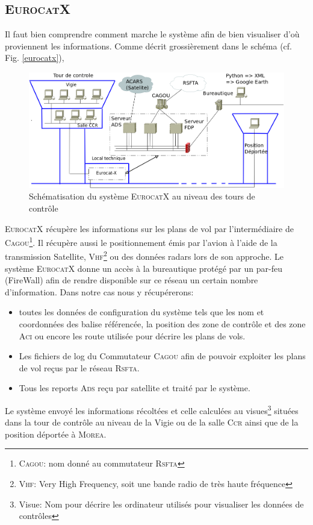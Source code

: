     \subsection{\textsc{EurocatX}}
Il faut bien comprendre comment marche le système afin de bien visualiser d'où proviennent les informations. Comme décrit grossièrement dans le schéma (cf. Fig. \vref{eurocatx}),
\begin{figure}
    \center
    \includegraphics[width=15cm]{images/SchemaControle.png}
    \caption{Schématisation du système \textsc{EurocatX} au niveau des tours de contrôle}
    \label{eurocatx}
\end{figure}
\textsc{EurocatX} récupère les informations sur les plans de vol par l'intermédiaire de \textsc{Cagou}\footnote{\textsc{Cagou}: nom donné au commutateur \textsc{Rsfta}}. Il récupère aussi le positionnement émis par l'avion à l'aide de la transmission Satellite, \textsc{Vhf}\footnote{\textsc{Vhf}: Very High Frequency, soit une bande radio de très haute fréquence} ou des données radars lors de son approche. Le système \textsc{EurocatX} donne un accès à la bureautique protégé par un par-feu (FireWall) afin de rendre disponible sur ce réseau un certain nombre d'information. Dans notre cas nous y récupérerons:
\begin{itemize}
    \item toutes les données de configuration du système tels que les nom et coordonnées des balise référencée, la position des zone de contrôle et des zone \textsc{Aci} ou encore les route utilisée pour décrire les plans de vols.
    \item Les fichiers de log du Commutateur \textsc{Cagou} afin de pouvoir exploiter les plans de vol reçus par le réseau \textsc{Rsfta}.
    \item Tous les reports \textsc{Ads} reçu par satellite et traité par le système.
\end{itemize}\medskip 
Le système envoyé les informations récoltées et celle calculées au visues\footnote{Visue: Nom pour décrire les ordinateur utilisés pour visualiser les données de contrôles} situées dans la tour de contrôle au niveau de la Vigie ou de la salle \textsc{Ccr} ainsi que de la position déportée à \textsc{Morea}.

